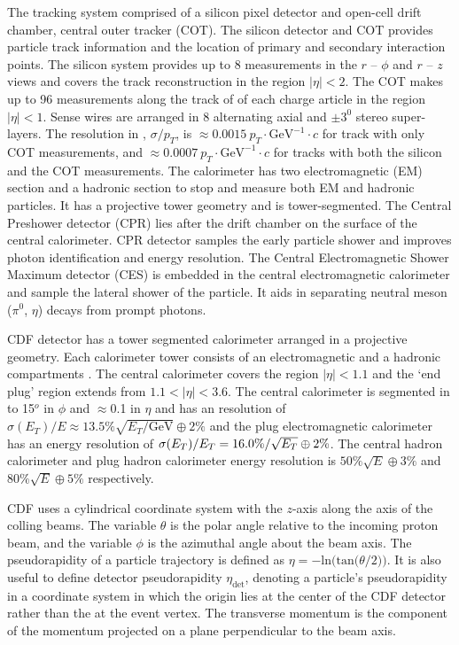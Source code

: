 \documentclass[12pt,twoside,letterpaper,doublespace]{article}
\begin{document}
The tracking system comprised of a silicon pixel detector and open-cell drift chamber, central outer tracker (COT). The silicon detector and COT provides particle track information and the location of primary and secondary interaction points. The silicon system provides up to 8 measurements in the $r$ -- $\phi$ and $r$ -- $z$ views and covers the track reconstruction in the region $|\eta|<2$. The COT makes up to 96 measurements along the track of of each charge article in the region $|\eta|<1$. Sense wires are arranged in 8 alternating axial and $\pm3^{0}$ stereo super-layers. The resolution in \pt, $\sigma/p_{T}$, is $\approx 0.0015~p_{T}\cdot\mathrm{GeV^{-1}}\cdot c$ for track with only COT measurements, and $\approx 0.0007~p_{T}\cdot \mathrm{GeV}^{-1}\cdot c$ for tracks with both the silicon and the COT measurements. The calorimeter has two electromagnetic (EM) section and a hadronic section to stop and measure both  EM and hadronic particles. It has a projective tower geometry and is tower-segmented. The Central Preshower detector (CPR) lies after the drift chamber on the surface of the central calorimeter. CPR detector samples the early particle shower and improves photon identification and energy resolution. The Central Electromagnetic Shower Maximum detector (CES) is embedded in the central electromagnetic calorimeter and sample the lateral shower of the particle. It aids in separating neutral meson ($\pi^{0}$, $\eta$) decays from prompt photons.

CDF detector has a tower segmented calorimeter arranged in a projective geometry. Each calorimeter tower consists of an electromagnetic and a hadronic compartments \cite{ref:EMHADCals}. The central calorimeter covers the region $|\eta|<1.1$ and the `end plug' region extends from $1.1<|\eta|<3.6$. The central calorimeter is segmented in to 15$^{o}$ in $\phi$ and $\approx$0.1 in $\eta$ and has an \et resolution of $\sigma(E_{T})/E\approx 13.5\%\sqrt{E_{T}/\mathrm{GeV}} \oplus 2\%$ and the plug electromagnetic calorimeter has an energy resolution of $\sigma(\mbox{$E_T$})/\mbox{$E_T$} = 16.0\%/\sqrt{\mbox{$E_T$}} \oplus 2\%$. The central hadron calorimeter and plug hadron calorimeter energy resolution is $50\%\sqrt{E} \oplus 3\%$ and $80\%\sqrt{E} \oplus 5\%$ respectively.

CDF uses a cylindrical coordinate system with the $z$-axis along the axis of the colling beams. The variable $\theta$ is the polar angle relative to the incoming proton beam, and the variable $\phi$ is the azimuthal angle about the beam axis. The pseudorapidity of a particle trajectory is defined as $\eta=-\mathrm{ln(tan(}\theta/2))$. It is also useful to define detector pseudorapidity $\eta_{\mathrm{det}}$, denoting a particle's pseudorapidity in a coordinate system in which the origin lies at the center of the CDF detector rather than the at the event vertex. The transverse momentum \pt is the component of the momentum projected on a plane perpendicular to the beam axis.
\end{document}
